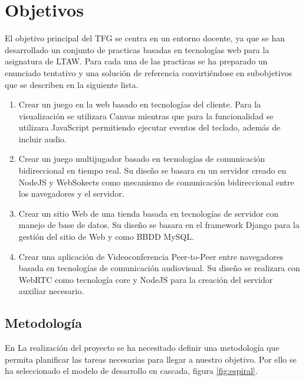 \chapter{Objetivos} 
El objetivo principal del TFG se centra en un entorno docente, ya que se han desarrollado un conjunto de practicas basadas en tecnologías web para la asignatura de LTAW. Para cada una de las practicas se ha preparado un enunciado tentativo y una solución de referencia convirtiéndose en subobjetivos que se describen en la siguiente lista.
\begin{enumerate}
\item  Crear un juego en la web basado en tecnologías del cliente. Para la visualización se utilizara Canvas mientras que para la funcionalidad se utilizara JavaScript permitiendo ejecutar eventos del teclado, además de incluir audio.
\item Crear un juego multijugador basado en tecnologías de comunicación bidireccional en tiempo real. Su diseño se basara en un servidor creado en NodeJS y WebSokects como mecanismo de comunicación bidireccional entre los navegadores y el servidor.
\item Crear un sitio Web de una tienda basada en tecnologías de servidor con manejo de base de datos. Su diseño se basara en el framework Django para la gestión del sitio de Web y como BBDD MySQL.
\item Crear una aplicación de Videoconferencia Peer-to-Peer entre navegadores basada en tecnologías de comunicación audiovisual. Su diseño se realizara con WebRTC como tecnología core y NodeJS para la creación del servidor auxiliar necesario.
\end{enumerate}
\section{Metodología}
En La realización del proyecto se ha necesitado definir una metodología que permita planificar las tareas necesarias para llegar a nuestro objetivo. Por ello se ha seleccionado el modelo de desarrollo en cascada, figura \ref{fig:espiral}.

